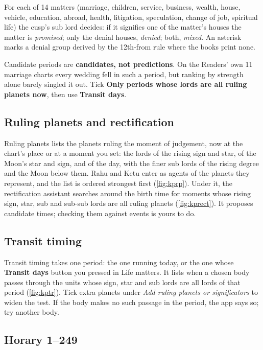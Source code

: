\documentclass[11pt, a4paper]{article}
\newcommand{\shot}[1]{}
\newcommand{\ui}[1]{\textbf{\textsf{#1}}}   %
\begin{document}
For each of 14 matters (marriage, children, service, business, wealth, house, vehicle, education, abroad,
health, litigation, speculation, change of job, spiritual life) the cusp's sub lord decides: if it
signifies one of the matter's houses the matter is \emph{promised}; only the denial houses, \emph{denied};
both, \emph{mixed}. An asterisk marks a denial group derived by the 12th-from rule where the books print none.

\shot{kpmatter}

\begin{warnbox}\kpit Candidate periods are \textbf{candidates, not predictions}. On the Readers' own 11
marriage charts every wedding fell in such a period, but ranking by strength alone barely singled it out.
Tick \ui{Only periods whose lords are all ruling planets now}, then use \ui{Transit days}.\end{warnbox}

\subsection{Ruling planets and rectification}
Ruling planets lists the planets ruling the moment of judgement, now at the chart's place or at a
moment you set: the lords of the rising sign and star, of the Moon's star and sign, and of the day,
with the finer sub lords of the rising degree and the Moon below them. Rahu and Ketu enter as
agents of the planets they represent, and the list is ordered strongest first
(\autoref{fig:kprp}). Under it, the rectification assistant searches around the birth time for
moments whose rising sign, star, sub and sub-sub lords are all ruling planets
(\autoref{fig:kprect}). It proposes candidate times; checking them against events is yours to do.
\shot{kprp}
\shot{kprect}

\subsection{Transit timing}
Transit timing takes one period: the one running today, or the one whose \textbf{Transit days}
button you pressed in Life matters. It lists when a chosen body passes through the units whose
sign, star and sub lords are all lords of that period (\autoref{fig:kptr}). Tick extra planets
under \emph{Add ruling planets or significators} to widen the test. If the body makes no such
passage in the period, the app says so; try another body.
\shot{kptr}

\subsection{Horary 1--249}
\shot{kphor}
\shot{kphorc}
\end{document}
